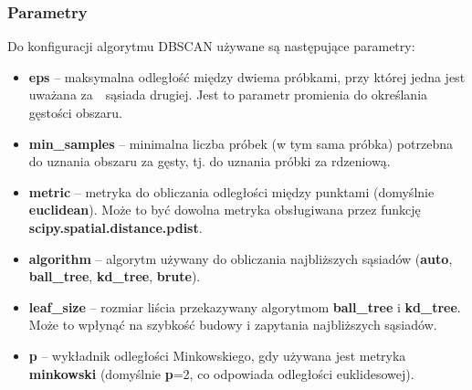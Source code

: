 		\subsubsection{Parametry}
			Do konfiguracji algorytmu DBSCAN używane są następujące parametry:
			\begin{itemize}
				\item \textbf{eps} -- maksymalna odległość między dwiema próbkami, przy której jedna jest uważana za~~sąsiada drugiej. Jest to parametr promienia do określania gęstości obszaru.
				\item \textbf{min\_samples} -- minimalna liczba próbek (w tym sama próbka) potrzebna do uznania obszaru za gęsty, tj. do uznania próbki za rdzeniową.
				\item \textbf{metric} -- metryka do obliczania odległości między punktami (domyślnie \textbf{euclidean}). Może to być dowolna metryka obsługiwana przez funkcję \textbf{scipy.spatial.distance.pdist}.
				\item \textbf{algorithm} -- algorytm używany do obliczania najbliższych sąsiadów (\textbf{auto}, \textbf{ball\_tree}, \textbf{kd\_tree}, \textbf{brute}).
				\item \textbf{leaf\_size} -- rozmiar liścia przekazywany algorytmom \textbf{ball\_tree} i \textbf{kd\_tree}. Może to wpłynąć na szybkość budowy i zapytania najbliższych sąsiadów.
				\item \textbf{p} -- wykładnik odległości Minkowskiego, gdy używana jest metryka \textbf{minkowski} (domyślnie \textbf{p}=2, co odpowiada odległości euklidesowej).
			\end{itemize}
			
			
